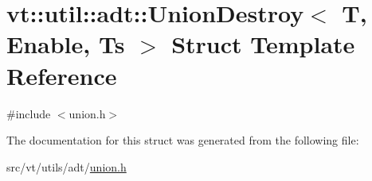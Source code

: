 \hypertarget{structvt_1_1util_1_1adt_1_1_union_destroy}{}\section{vt\+:\+:util\+:\+:adt\+:\+:Union\+Destroy$<$ T, Enable, Ts $>$ Struct Template Reference}
\label{structvt_1_1util_1_1adt_1_1_union_destroy}


{\ttfamily \#include $<$union.\+h$>$}



The documentation for this struct was generated from the following file\+:\begin{DoxyCompactItemize}
\item 
src/vt/utils/adt/\hyperlink{union_8h}{union.\+h}\end{DoxyCompactItemize}
